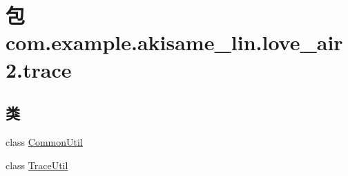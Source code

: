 \hypertarget{namespacecom_1_1example_1_1akisame__lin_1_1love__air2_1_1trace}{}\section{包 com.\+example.\+akisame\+\_\+lin.\+love\+\_\+air2.\+trace}
\label{namespacecom_1_1example_1_1akisame__lin_1_1love__air2_1_1trace}
\subsection*{类}
\begin{DoxyCompactItemize}
\item 
class \mbox{\hyperlink{classcom_1_1example_1_1akisame__lin_1_1love__air2_1_1trace_1_1_common_util}{Common\+Util}}
\item 
class \mbox{\hyperlink{classcom_1_1example_1_1akisame__lin_1_1love__air2_1_1trace_1_1_trace_util}{Trace\+Util}}
\end{DoxyCompactItemize}
